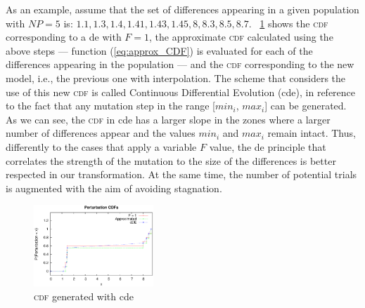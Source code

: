 \documentclass[review,3p]{elsarticle}
\newcommand{\CDE}{c{\sc de}}
\newcommand{\DE}{{\sc de}}
\begin{document}
As an example, assume that the set of differences
appearing in a given population with $NP = 5$ is: ${1.1, 1.3, 1.4, 1.41, 1.43, 1.45, 8, 8.3, 8.5, 8.7}$.
%
\figurename~\ref{fig:new_CDFs} shows the \textsc{cdf} corresponding to a \DE{} with $F = 1$, the
approximate \textsc{cdf} calculated using the above steps --- function (\ref{eq:approx_CDF}) is evaluated for each of
the differences appearing in the population ---
and
the \textsc{cdf} corresponding to the new model, i.e., the previous one with interpolation.
%
The scheme that considers the use of this new \textsc{cdf} is called Continuous Differential Evolution (\CDE{}),
in reference to the fact that any mutation step in the range [$min_i$, $max_i$] can be generated.
%
As we can see, the \textsc{cdf} in \CDE{} has a larger slope in the zones where a larger number of differences appear
and the values $min_i$ and $max_i$ remain intact.
%
Thus, differently to the cases that apply a variable $F$ value, 
the \DE{} principle that correlates the strength of the mutation to the size of the differences is better respected
in our transformation.
%
At the same time, the number of potential trials is augmented with the aim of avoiding stagnation.

\begin{figure}[!t]
\centering
\includegraphics[width=0.40\textwidth]{images/CDFs/cdf_new.eps}
\caption{\textsc{cdf} generated with \CDE{}}
\label{fig:new_CDFs}
\end{figure}
\end{document}
